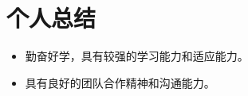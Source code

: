 \documentclass[11pt]{article}
\newlength{\iconwidth}
\begin{document}
    \begin{minipage}[t]{\textwidth}
        \section[个人总结]{\makebox[\iconwidth][c]{\color{primary_color}{\faUserCircle}}\quad 个人总结}
        
        \begin{itemize}
            \item 勤奋好学，具有较强的学习能力和适应能力。
            \item 具有良好的团队合作精神和沟通能力。
        \end{itemize}
        
    \vspace{1.2em}
    \end{minipage}


    
\end{document}
